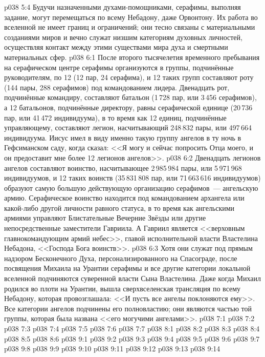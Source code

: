 \vs p038 5:4 Будучи назначенными духами\hyp{}помощниками, серафимы, выполняя задание, могут перемещаться по всему Небадону, даже Орвонтону. Их работа во вселенной не имеет границ и ограничений; они тесно связаны с материальными созданиями миров и вечно служат низшим категориям духовных личностей, осуществляя контакт между этими существами мира духа и смертными материальных сфер.
\vs p038 6:1 После второго тысячелетия временного пребывания на серафическом центре серафимы организуются в группы, подчинённые руководителям, по 12 (12 пар, 24 серафима), и 12 таких групп составляют роту (144 пары, 288 серафимов) под командованием лидера. Двенадцать рот, подчинённые командиру, составляют батальон (1\,728 пар, или 3\,456 серафимов), а 12 батальонов, подчинённые директору, равны серафической единице (20\,736 пар, или 41\,472 индивидуума), в то время как 12 единиц, подчинённые управляющему, составляют легион, насчитывающий 248\,832 пары, или 497\,664 индивидуума. Иисус имел в виду именно такую группу ангелов в ту ночь в Гефсиманском саду, когда сказал: <<Я могу и сейчас попросить Отца моего, и он предоставит мне более 12 легионов ангелов>>.
\vs p038 6:2 Двенадцать легионов ангелов составляют воинство, насчитывающее 2\,985\,984 пары, или 5\,971\,968 индивидуумов, и 12 таких воинств (35\,831\,808 пар, или 71\,663\,616 индивидуумов) образуют самую большую действующую организацию серафимов~--- ангельскую армию. Серафическое воинство находится под командованием архангела или какой\hyp{}либо другой личности равного статуса, в то время как ангельскими армиями управляют Блистательные Вечерние Звёзды или другие непосредственные заместители Гавриила. А Гавриил является <<верховным главнокомандующим армий небес>>, главой исполнительной власти Властелина Небадона, <<Господа Бога воинств>>.
\vs p038 6:3 Хотя они служат под прямым надзором Бесконечного Духа, персонализированного на Спасограде, после посвящения Михаила на Урантии серафимы и все другие категории локальной вселенной подчиняются суверенной власти Сына Властелина. Даже когда Михаил родился во плоти на Урантии, вышла сверхвселенская трансляция по всему Небадону, которая провозглашала: <<И пусть все ангелы поклоняются ему>>. Все категории ангелов подчинены его полновластию; они являются частью той группы, которая была названа <<его могучими ангелами>>.
\vs p038 7:1 
\vs p038 7:2 
\vs p038 7:3 \pc 
\vs p038 7:4 
\vs p038 7:5 \pc 
\vs p038 7:6 \pc 
\vs p038 7:7 
\vs p038 8:1 
\vs p038 8:2 
\vs p038 8:3 
\vs p038 8:4 
\vs p038 8:5 \pc 
\vs p038 8:6 
\vs p038 9:1 
\vs p038 9:2 
\vs p038 9:3 
\vs p038 9:4 
\vs p038 9:5 \pc 
\vs p038 9:6 
\vs p038 9:7 
\vs p038 9:8 
\vs p038 9:9 
\vs p038 9:10 \pc 
\vs p038 9:11 
\vs p038 9:12 
\vs p038 9:13 \pc 
\vsetoff
\vs p038 9:14 
\quizlink
